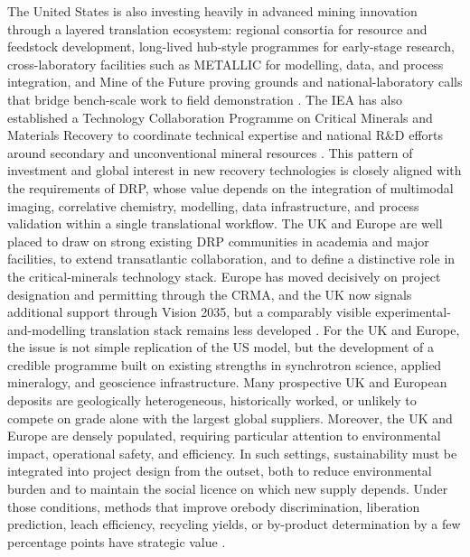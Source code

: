 \documentclass[12pt,a4paper]{article}
\begin{document}
The United States is also investing heavily in advanced mining innovation through a layered translation ecosystem: regional consortia for resource and feedstock development, long-lived hub-style programmes for early-stage research, cross-laboratory facilities such as METALLIC for modelling, data, and process integration, and Mine of the Future proving grounds and national-laboratory calls that bridge bench-scale work to field demonstration \cite{doe_regional_consortia_2025, doe_cmi_2025, doe_metallic_2024, doe_motf_launch_2025}. The IEA has also established a Technology Collaboration Programme on Critical Minerals and Materials Recovery to coordinate technical expertise and national R\&D efforts around secondary and unconventional mineral resources \cite{iea_cmmr_tcp_2026}. This pattern of investment and global interest in new recovery technologies is closely aligned with the requirements of DRP, whose value depends on the integration of multimodal imaging, correlative chemistry, modelling, data infrastructure, and process validation within a single translational workflow. The UK and Europe are well placed to draw on strong existing DRP communities in academia and major facilities, to extend transatlantic collaboration, and to define a distinctive role in the critical-minerals technology stack. Europe has moved decisively on project designation and permitting through the CRMA, and the UK now signals additional support through Vision 2035, but a comparably visible experimental-and-modelling translation stack remains less developed \cite{eu_strategic_projects_2025, uk_vision_2035_2026}. For the UK and Europe, the issue is not simple replication of the US model, but the development of a credible programme built on existing strengths in synchrotron science, applied mineralogy, and geoscience infrastructure. Many prospective UK and European deposits are geologically heterogeneous, historically worked, or unlikely to compete on grade alone with the largest global suppliers. Moreover, the UK and Europe are densely populated, requiring particular attention to environmental impact, operational safety, and efficiency. In such settings, sustainability must be integrated into project design from the outset, both to reduce environmental burden and to maintain the social licence on which new supply depends. Under those conditions, methods that improve orebody discrimination, liberation prediction, leach efficiency, recycling yields, or by-product determination by a few percentage points have strategic value \cite{albert_crm_europe_2025, bgs_uk_crm_2022, calvo_copper_2016}.
\end{document}
